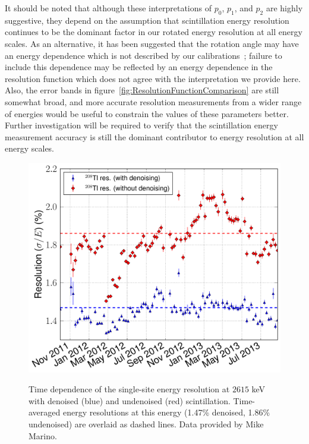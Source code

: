 It should be noted that although these interpretations of $p_0$, $p_1$, and $p_2$ are highly suggestive, they depend on the assumption that scintillation energy resolution continues to be the dominant factor in our rotated energy resolution at all energy scales.  As an alternative, it has been suggested that the rotation angle may have an energy dependence which is not described by our calibrations~\cite{EnergyDocumentRun2a}; failure to include this dependence may be reflected by an energy dependence in the resolution function which does not agree with the interpretation we provide here.  Also, the error bands in figure~\ref{fig:ResolutionFunctionComparison} are still somewhat broad, and more accurate resolution measurements from a wider range of energies would be useful to constrain the values of these parameters better.  Further investigation will be required to verify that the scintillation energy measurement accuracy is still the dominant contributor to energy resolution at all energy scales.

\begin{figure}
\begin{center}
\includegraphics[keepaspectratio=true,width=\textwidth]{RotatedReso_denoised_compVsTime.pdf}
\end{center}
\renewcommand{\baselinestretch}{1}
\small\normalsize
\begin{quote}
\caption{Time dependence of the single-site energy resolution at $2615$ keV with denoised (blue) and undenoised (red) scintillation.  Time-averaged energy resolutions at this energy (1.47\% denoised, 1.86\% undenoised) are overlaid as dashed lines.  Data provided by Mike Marino.}
\label{fig:ResolutionTimeDependenceComparison}
\end{quote}
\end{figure}
\renewcommand{\baselinestretch}{2}
\small\normalsize

